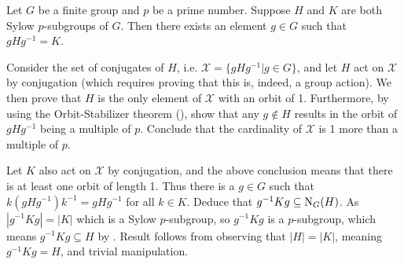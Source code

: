 \begin{theorem}[Sylow II]\label{thrm-sylow-2}
    Let $G$ be a finite group and $p$ be a prime number. Suppose $H$ and $K$ are both Sylow $p$-subgroups of $G$. Then there exists an element $g \in G$ such that $gHg^{-1} = K$.
\end{theorem}
\begin{proofsketch}
    Consider the set of conjugates of $H$, i.e. $\mathcal{X} = \{gHg^{-1} \vert g \in G\}$, and let $H$ act on $\mathcal{X}$ by conjugation (which requires proving that this is, indeed, a group action). We then prove that $H$ is the only element of $\mathcal{X}$ with an orbit of 1. Furthermore, by using the Orbit-Stabilizer theorem (), show that any $g \notin H$ results in the orbit of $gHg^{-1}$ being a multiple of $p$. Conclude that the cardinality of $\mathcal{X}$ is 1 more than a multiple of $p$.

    Let $K$ also act on $\mathcal{X}$ by conjugation, and the above conclusion means that there is at least one orbit of length 1. Thus there is a $g \in G$ such that $k(gHg^{-1})k^{-1} = gHg^{-1}$ for all $k \in K$. Deduce that $g^{-1}Kg \subseteq \mathrm{N}_{G}(H)$. As $|g^{-1}Kg| = |K|$ which is a Sylow $p$-subgroup, so $g^{-1}Kg$ is a $p$-subgroup, which means $g^{-1}Kg \subseteq H$ by . Result follows from observing that $|H| = |K|$, meaning $g^{-1}Kg = H$, and trivial manipulation.
\end{proofsketch}
